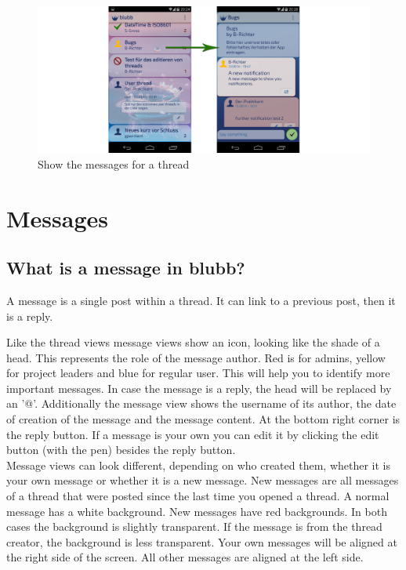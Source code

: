 \documentclass[12pt,a4paper,oneside]{report}
\newcommand{\appname}{blubb}
\begin{document}
\begin{figure}[!ht]
    \includegraphics[width=\linewidth]{ShowMessages.png}
    \caption{Show the messages for a thread}
\end{figure}

\section{Messages}
\subsection{What is a message in \appname{}?}
A message is a single post within a thread. It can link to a previous post, then it is a reply.

Like the thread views message views show an icon, looking like the shade of a head. This represents the role of the message author. Red is for admins, yellow for project leaders and blue for regular user. This will help you to identify more important messages.
In case the message is a reply, the head will be replaced by an '@'.
Additionally the message view shows the username of its author, the date of creation of the message and the message content. At the bottom right corner is the reply button. If a message is your own you can edit it by clicking the edit button (with the pen) besides the reply button.\\

Message views can look different, depending on who created them, whether it is your own message or whether it is a new message. New messages are all messages of a thread that were posted since the last time you opened a thread. A normal message has a white background. New messages have red backgrounds. In both cases the background is slightly transparent. If the message is from the thread creator, the background is less transparent. 
Your own messages will be aligned at the right side of the screen. All other messages are aligned at the left side.
\end{document}
